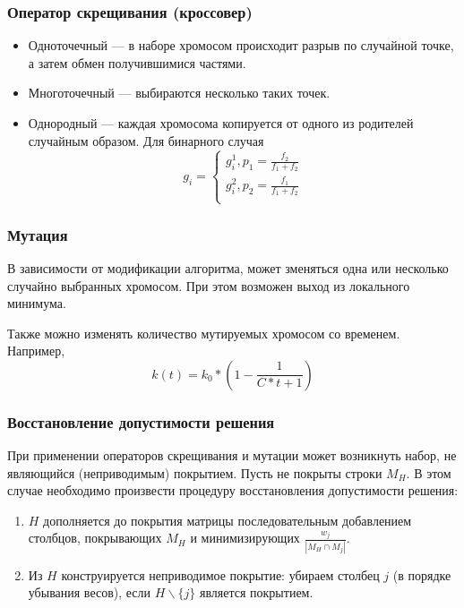 \documentclass[
	11pt,
]{beamer}
\begin{document}
\begin{frame}
	\frametitle{Оператор скрещивания (кроссовер)}

	\begin{itemize}
			\item Одноточечный — в наборе хромосом происходит разрыв по случайной точке, а затем обмен получившимися частями.
			\item Многоточечный — выбираются несколько таких точек.
			\item Однородный — каждая хромосома копируется от одного из родителей случайным образом. Для бинарного случая
				  $$
				  g_i = 
				  \begin{cases}
					g^1_i, p_1 = \frac{f_2}{f_1 + f_2} \\
					g^2_i, p_2 = \frac{f_1}{f_1 + f_2} \\
				  \end{cases}
				  $$
	\end{itemize}
\end{frame}

\begin{frame}
	\frametitle{Мутация}

	В зависимости от модификации алгоритма, может зменяться одна или несколько случайно выбранных хромосом. При этом возможен выход из локального минимума.

	\bigskip

	Также можно изменять количество мутируемых хромосом со временем. Например,
	$$k(t) = k_0 * (1 - \frac{1}{C*t + 1})$$
\end{frame}

\begin{frame}
	\frametitle{Восстановление допустимости решения}

	При применении операторов скрещивания и мутации может возникнуть набор, не являющийся (неприводимым) покрытием. Пусть не покрыты строки $M_H$. В этом случае необходимо произвести процедуру восстановления допустимости решения:
	\begin{enumerate}
		\item $H$ дополняется до покрытия матрицы последовательным добавлением столбцов, покрывающих $M_H$ и минимизирующих $\frac{w_j}{|M_H \cap M_j|}$.
		\item Из $H$ конструируется неприводимое покрытие: убираем столбец $j$ (в порядке убывания весов), если $H \backslash \{j\}$ является покрытием. 
	\end{enumerate}
\end{frame}
\end{document}

